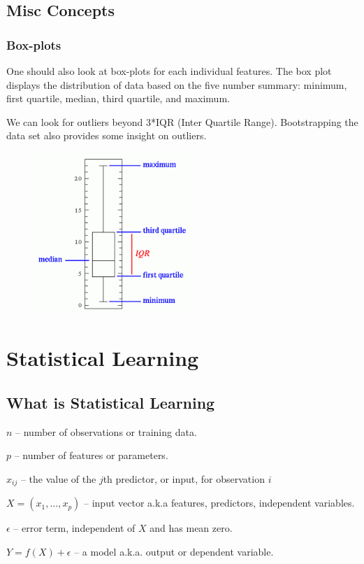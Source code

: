 \documentclass{article}
\numberwithin{equation}{section}
\begin{document}
\newpage
\subsection{Misc Concepts}
\subsubsection{Box-plots}
One should also look at box-plots for each individual features. The box plot displays the distribution of data based on the five number summary: minimum, first quartile, median, third quartile, and maximum.

We can look for outliers beyond 3*IQR (Inter Quartile Range). Bootstrapping the data set also provides some insight on outliers.
\begin{figure}[H]
    \centering
    \includegraphics[width=6cm]{box-plot.png}
\end{figure}

\newpage
\section{Statistical Learning}
\subsection{What is Statistical Learning}
$n$ -- number of observations or training data.

$p$ -- number of features or parameters.

$x_{ij}$ -- the value of the $j$th predictor, or input, for observation $i$

$X = (x_1, \dots, x_p)$  -- input vector a.k.a features, predictors, independent variables.

$\epsilon$  -- error term, independent of $X$ and has mean zero.

$Y = f(X) + \epsilon$ -- a model a.k.a. output or dependent variable.
\end{document}
